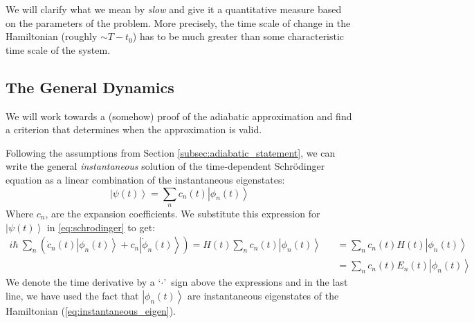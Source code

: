 \documentclass[12pt,a4paper]{article}
\begin{document}
	We will clarify what we mean by \emph{slow} and give it a quantitative measure based on the parameters of the problem. More precisely, the time scale of change in the Hamiltonian (roughly $\sim T - t_{0}$) has to be much greater than some characteristic time scale of the system.
	
	\subsection{The General Dynamics}
	\label{subsec:general_dynamics}
	
	We will work towards a (somehow) proof of the adiabatic approximation and find a criterion that determines when the approximation is valid.
	
	Following the assumptions from Section \ref{subsec:adiabatic_statement}, we can write the general \emph{instantaneous} solution of the time-dependent Schr\"{o}dinger equation as a linear combination of the instantaneous eigenstates:
	\begin{equation}
		\left| \psi(t) \right\rangle = \sum_{n} c_{n}(t) \left| \phi_{n}(t) \right\rangle
		\label{eq:expansion}
	\end{equation}
	Where $c_{n}$, are the expansion coefficients. We substitute this expression for $\left| \psi(t) \right\rangle$ in \eqref{eq:schrodinger} to get:
	\begin{align}
		i \hbar\ \sum_{n} \left( \dot{c}_{n}(t) \left|\phi_{n}(t)\right\rangle + c_{n} \left| \dot{\phi}_{n}(t)\right\rangle \right) = H(t) \sum_{n} c_{n}(t) \left| \phi_{n}(t) \right\rangle &&= \sum_{n} c_{n}(t) H(t) \left| \phi_{n}(t) \right\rangle \nonumber \\
		&&= \sum_{n} c_{n}(t) E_{n}(t) \left| \phi_{n}(t) \right\rangle \nonumber
		\label{eq:expansion_substituted}
	\end{align}
	We denote the time derivative by a \textquoteleft $\cdotp$\textquoteright\ sign above the expressions and in the last line, we have used the fact that $\left| \phi_{n}(t) \right\rangle$ are instantaneous eigenstates of the Hamiltonian (\eqref{eq:instantaneous_eigen}).
	
\end{document}
